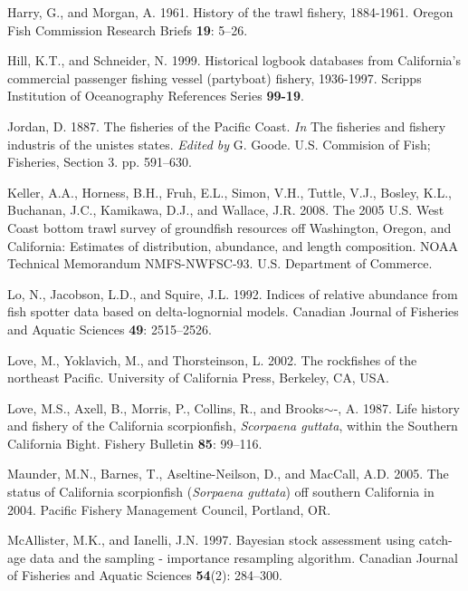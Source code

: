 \documentclass[12pt,]{article}
\begin{document}
\hypertarget{ref-Harry1961}{}
Harry, G., and Morgan, A. 1961. History of the trawl fishery, 1884-1961.
Oregon Fish Commission Research Briefs \textbf{19}: 5--26.

\hypertarget{ref-Hill1999}{}
Hill, K.T., and Schneider, N. 1999. Historical logbook databases from
California's commercial passenger fishing vessel (partyboat) fishery,
1936-1997. Scripps Institution of Oceanography References Series
\textbf{99-19}.

\hypertarget{ref-Jordan1887}{}
Jordan, D. 1887. The fisheries of the Pacific Coast. \emph{In} The
fisheries and fishery industris of the unistes states. \emph{Edited by}
G. Goode. U.S. Commision of Fish; Fisheries, Section 3. pp. 591--630.

\hypertarget{ref-Keller2008}{}
Keller, A.A., Horness, B.H., Fruh, E.L., Simon, V.H., Tuttle, V.J.,
Bosley, K.L., Buchanan, J.C., Kamikawa, D.J., and Wallace, J.R. 2008.
The 2005 U.S. West Coast bottom trawl survey of groundfish resources off
Washington, Oregon, and California: Estimates of distribution,
abundance, and length composition. NOAA Technical Memorandum
NMFS-NWFSC-93. U.S. Department of Commerce.

\hypertarget{ref-Lo1992}{}
Lo, N., Jacobson, L.D., and Squire, J.L. 1992. Indices of relative
abundance from fish spotter data based on delta-lognornial models.
Canadian Journal of Fisheries and Aquatic Sciences \textbf{49}:
2515--2526.

\hypertarget{ref-Love2002}{}
Love, M., Yoklavich, M., and Thorsteinson, L. 2002. The rockfishes of
the northeast Pacific. University of California Press, Berkeley, CA,
USA.

\hypertarget{ref-Love1987}{}
Love, M.S., Axell, B., Morris, P., Collins, R., and Brooks\(\sim\)-, A.
1987. Life history and fishery of the California scorpionfish,
\emph{Scorpaena guttata}, within the Southern California Bight. Fishery
Bulletin \textbf{85}: 99--116.

\hypertarget{ref-Maunder2005}{}
Maunder, M.N., Barnes, T., Aseltine-Neilson, D., and MacCall, A.D. 2005.
The status of California scorpionfish (\emph{Sorpaena guttata}) off
southern California in 2004. Pacific Fishery Management Council,
Portland, OR.

\hypertarget{ref-McAllister1997}{}
McAllister, M.K., and Ianelli, J.N. 1997. Bayesian stock assessment
using catch-age data and the sampling - importance resampling algorithm.
Canadian Journal of Fisheries and Aquatic Sciences \textbf{54}(2):
284--300.
\end{document}
